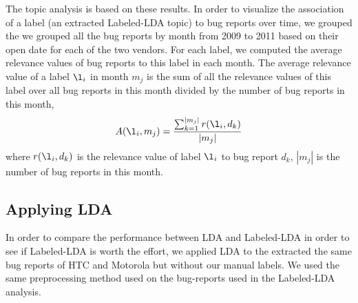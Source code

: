 \documentclass[10pt, conference, compsocconf]{IEEEtran}
\begin{document}
The topic analysis is based on these results. 
In order to visualize the association of a label (an extracted
Labeled-LDA topic) to bug reports over time, we grouped the 
we grouped
all the bug reports by month from 2009 to 2011 based on their open
date for each of the two vendors. 
For each label, we computed the average relevance values of bug
reports to this label in each month. 
The average relevance value of a label \begin{math} \l_i \end{math} in month \begin{math} m_j \end{math} is the sum of all the relevance values of this label over all bug reports in this month divided by the number of bug reports in this month,
\begin{equation}
A(\l_i,m_j) = \frac{\sum_{\substack{k=1}}^{|m_j|}r(\l_i,d_k)}{|m_j|}
\end{equation}
where $r(\l_i,d_k)$ is the relevance value of label $\l_i$ to bug
report $d_k$, $|m_j|$ is the number of bug reports in this month. 


\subsection{Applying LDA}




In order to compare the performance between LDA and Labeled-LDA in
order to see if Labeled-LDA is worth the effort, 
we applied LDA to the extracted the same bug reports of HTC and Motorola
but without our manual labels. 
We used the same preprocessing method used on the bug-reports used in
the Labeled-LDA analysis.
\end{document}
